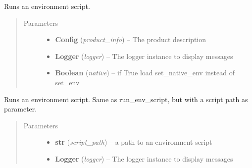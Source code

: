 \documentclass[a4paper,10pt,english]{sphinxmanual}
\begin{document}
\begin{fulllineitems}
\begin{fulllineitems}
\label{commands/apidoc/src:src.environment.SalomeEnviron.run_env_script}
Runs an environment script.
\begin{quote}\begin{description}
\item[{Parameters}] \leavevmode\begin{itemize}
\item {} 
\textbf{Config} (\emph{product\_info}) -- The product description

\item {} 
\textbf{Logger} (\emph{logger}) -- The logger instance to display messages

\item {} 
\textbf{Boolean} (\emph{native}) -- if True load set\_native\_env instead of set\_env

\end{itemize}

\end{description}\end{quote}

\end{fulllineitems}


\begin{fulllineitems}
\label{commands/apidoc/src:src.environment.SalomeEnviron.run_simple_env_script}
Runs an environment script. Same as run\_env\_script, but with a 
script path as parameter.
\begin{quote}\begin{description}
\item[{Parameters}] \leavevmode\begin{itemize}
\item {} 
\textbf{str} (\emph{script\_path}) -- a path to an environment script

\item {} 
\textbf{Logger} (\emph{logger}) -- The logger instance to display messages

\end{itemize}

\end{description}\end{quote}


\end{fulllineitems}
\end{fulllineitems}
\end{document}
